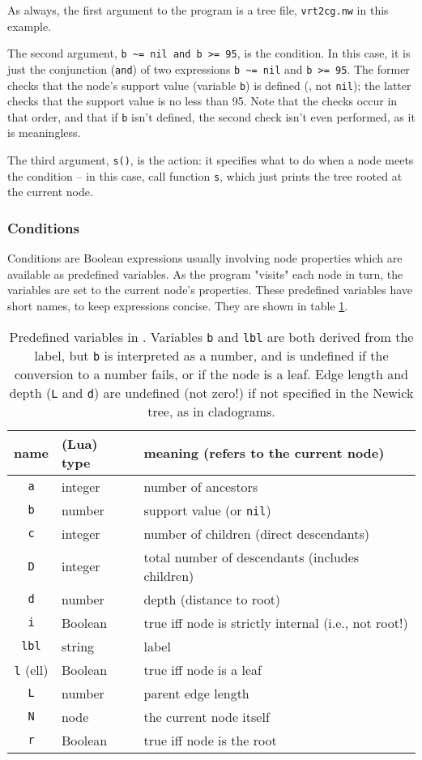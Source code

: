 \noindent{}As always, the first argument to the program is a tree file,
\texttt{vrt2cg.nw} in this example.

The second argument, \verb+b ~= nil and b >= 95+, is the condition.  In this
case, it is just the conjunction (\texttt{and}) of two expressions
\verb+b ~= nil+ and \texttt{b >= 95}.  The former checks that the node's support
value (variable \texttt{b}) is defined (\ie, not \texttt{nil}); the latter
checks that the support value is no less than 95. Note that the checks occur in
that order, and that if \texttt{b} isn't defined, the second check isn't even
performed, as it is meaningless.

The third argument, \texttt{s()}, is the action: it specifies what to do when a
node meets the condition -- in this case, call function \texttt{s},
which just prints the tree rooted at the current node.

\subsubsection{Conditions}

Conditions are Boolean expressions usually involving node properties which are
available as predefined variables. As the program "visits" each node in turn,
the variables are set to the current node's properties.  These predefined
variables have short names, to keep expressions concise. They are shown in table
\ref{tbl:luaedPredefVar}.

\begin{table}
	\centering
	\begin{tabular}{cll}
		name & (Lua) type & meaning (refers to the current node)\\
		\hline
		\texttt{a} & integer & number of ancestors  \\
		\texttt{b} & number & support value (or \texttt{nil}) \\
		\texttt{c} & integer & number of children (direct descendants) \\
		\texttt{D} & integer & total number of descendants (includes children) \\
		\texttt{d} & number & depth (distance to root) \\
		\texttt{i} & Boolean & true iff node is strictly internal (i.e., not root!) \\
		\texttt{lbl} & string & label \\
		\texttt{l} (ell) & Boolean & true iff node is a leaf \\
		\texttt{L} & number & parent edge length \\
		\texttt{N} & node & the current node itself \\
		\texttt{r} & Boolean & true iff node is the root
	\end{tabular}
	\caption{%
		\label{tbl:luaedPredefVar}
		Predefined variables in \luaed. Variables \texttt{b} and \texttt{lbl} are
		both derived from the label, but \texttt{b} is interpreted as a number, and
		is undefined if the conversion to a number fails, or if the node is a leaf.
		Edge length and depth (\texttt{L} and \texttt{d}) are undefined (not zero!)
		if not specified in the Newick tree, as in cladograms.
	}
\end{table}

